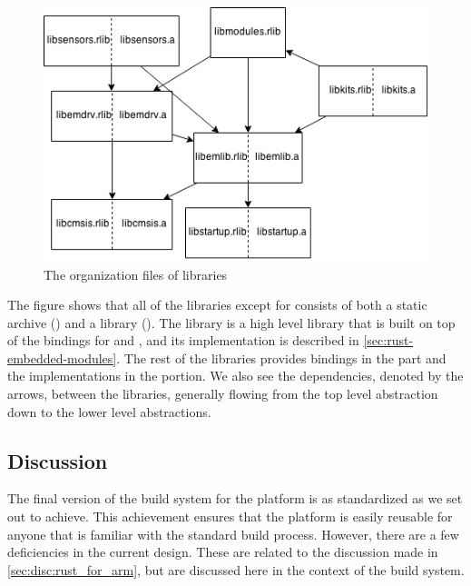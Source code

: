 \begin{figure}[H]
  \begin{center}
    \includegraphics[scale=0.5]{figures/lib-structure.png}
  \end{center}
  \caption{The organization files of libraries}
  \label{fig:lib:structure}
\end{figure}

The figure shows that all of the libraries except for  consists of both a {\C} static archive () and a {\rust} library ().
The  library is a high level library that is built on top of the bindings for {\emlib} and {\emdrv}, and its implementation is described in \autoref{sec:rust-embedded-modules}.
The rest of the libraries provides {\rust} bindings in the  part and the {\C} implementations in the  portion.
We also see the dependencies, denoted by the arrows, between the libraries, generally flowing from the top level abstraction down to the lower level abstractions.

\subsection{Discussion}

The final version of the build system for the {\rg} platform is as standardized as we set out to achieve.
This achievement ensures that the platform is easily reusable for anyone that is familiar with the standard {\cargo} build process.
However, there are a few deficiencies in the current design.
These are related to the discussion made in \autoref{sec:disc:rust_for_arm}, but are discussed here in the context of the build system.

